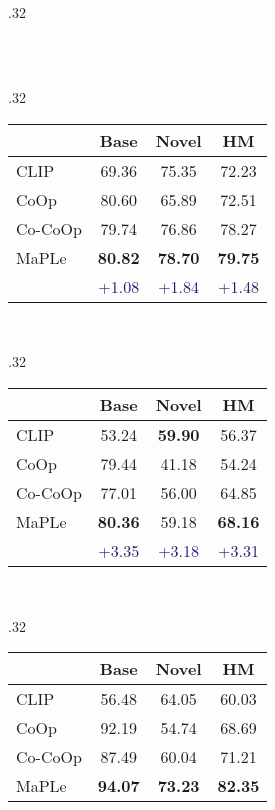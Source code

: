 \documentclass[10pt,twocolumn,letterpaper]{article}
\begin{document}
\begin{table*}[t!]
\begin{subtable}[t]{.32\textwidth}
\begin{tabular}{l cc|c}
    \end{tabular}
    \end{subtable}
    ~
    \begin{subtable}[t]{.32\textwidth}
    \centering
    \caption{SUN397}
    \begin{tabular}{l cc|c}
    \toprule
    & Base & Novel & HM \\
    \midrule
    CLIP & 69.36 & 75.35 & 72.23 \\
    CoOp & {80.60} & 65.89 & 72.51 \\
    Co-CoOp & 79.74 & {76.86} & {78.27} \\
    \midrule
        \rowcolor{tabhighlight}
    MaPLe & \textbf{80.82} & \textbf{78.70} & \textbf{79.75} \\
      &  \textcolor{MidnightBlue}{{+1.08}} &  \textcolor{MidnightBlue}{{+1.84}} &  \textcolor{MidnightBlue}{{+1.48}} \\
    \bottomrule
    \end{tabular}
    \end{subtable}
    ~
    \begin{subtable}[t]{.32\textwidth}
    \centering
    \caption{DTD}
    \begin{tabular}{l cc|c}
    \toprule
    & Base & Novel & HM \\
    \midrule
    CLIP & 53.24 & \textbf{59.90} & 56.37 \\
    CoOp & {79.44} & 41.18 & 54.24 \\
    Co-CoOp & 77.01 & 56.00 & {64.85} \\
    \midrule
        \rowcolor{tabhighlight}
    MaPLe & \textbf{80.36} & 59.18 & \textbf{68.16} \\
      &  \textcolor{MidnightBlue}{{+3.35}} &  \textcolor{MidnightBlue}{{+3.18}} &  \textcolor{MidnightBlue}{{+3.31}} \\
    \bottomrule
    \end{tabular}
    \end{subtable}
    ~
    \begin{subtable}[t]{.32\textwidth}
    \centering
    \caption{EuroSAT}
    \begin{tabular}{l cc|c}
    \toprule
    & Base & Novel & HM \\
    \midrule
    CLIP & 56.48 & {64.05} & 60.03 \\
    CoOp & {92.19} & 54.74 & 68.69 \\
    Co-CoOp & 87.49 & 60.04 & {71.21} \\
    \midrule
        \rowcolor{tabhighlight}
    MaPLe & \textbf{94.07} & \textbf{73.23} & \textbf{82.35} \\

\end{tabular}
\end{subtable}
\end{table*}
\end{document}
